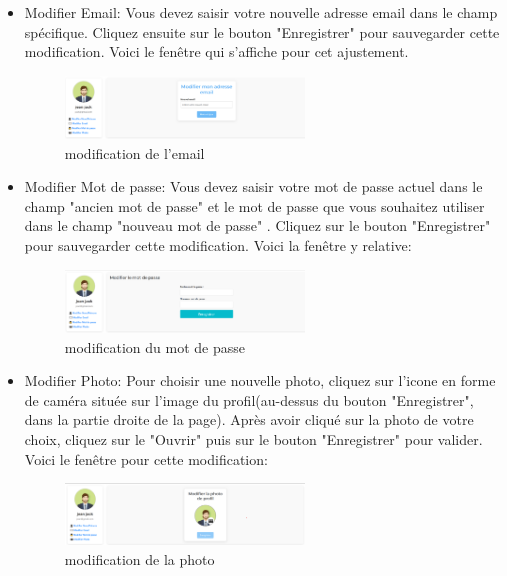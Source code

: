 \documentclass[12pt]{article}
\begin{document}
\begin{itemize}
\newpage
\item Modifier Email: Vous devez saisir votre nouvelle adresse email dans le champ spécifique. Cliquez ensuite sur le bouton "Enregistrer" pour sauvegarder cette modification. Voici le fenêtre qui s'affiche pour cet ajustement.
    \begin{figure}[h!]
        \centering
        \includegraphics[width=0.6\textwidth]{./images/modify-email.png}
        \caption{modification de l'email}
        \label{fig:modification de l'email}
    \end{figure}
\item Modifier Mot de passe: Vous devez saisir votre mot de passe actuel dans le champ  "ancien mot de passe"  et le mot de passe que vous souhaitez utiliser dans le champ  "nouveau mot de passe" . Cliquez sur le bouton "Enregistrer" pour sauvegarder cette modification. Voici la fenêtre y relative:
    \begin{figure}[h!]
        \centering
        \includegraphics[width=0.6\textwidth]{./images/modify-password.png}
        \caption{modification du mot de passe}
        \label{fig:modification du mot de passe}
    \end{figure}
\item Modifier Photo: Pour choisir une nouvelle photo, cliquez sur l'icone en forme de caméra située sur l'image du profil(au-dessus du bouton "Enregistrer", dans la partie droite de la page). Après avoir cliqué sur la photo de votre choix, cliquez sur le "Ouvrir" puis sur le bouton "Enregistrer" pour valider. Voici le fenêtre pour cette modification:
    \begin{figure}[h!]
        \centering
        \includegraphics[width=0.6\textwidth]{./images/modify-photo.png}
        \caption{modification de la photo}
        \label{fig:modification de la photo}
    \end{figure}
\end{itemize}
\end{document}
